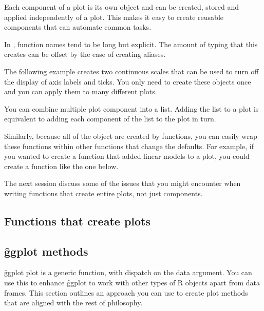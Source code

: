Each component of a \ggplot plot is its own object and can be created, stored and applied independently of a plot.  This makes it easy to create reusable components that can automate common tasks.

In \ggplot, function names tend to be long but explicit.  The amount of typing that this creates can be offset by the ease of creating aliases.

The following example creates two continuous scales that can be used to turn off the display of axis labels and ticks.  You only need to create these objects once and you can apply them to many different plots.

% 

You can combine multiple plot component into a list.  Adding the list to a plot is equivalent to adding each component of the list to the plot in turn.

Similarly, because all of the object are created by functions, you can easily wrap these functions within other functions that change the defaults.  For example, if you wanted to create a function that added linear models to a plot, you could create a function like the one below.

% 

The next session discuss some of the issues that you might encounter when writing functions that create entire plots, not just components.

\subsection{Functions that create plots}


\subsection{\f{ggplot} methods}
\label{sub:ggplot_methods}

\f{ggplot} plot is a generic function, with dispatch on the data argument.  You can use this to enhance \f{ggplot} to work with other types of R objects apart from data frames.  This section outlines an approach you can use to create plot methods that are aligned with the rest of \ggplot philosophy.

